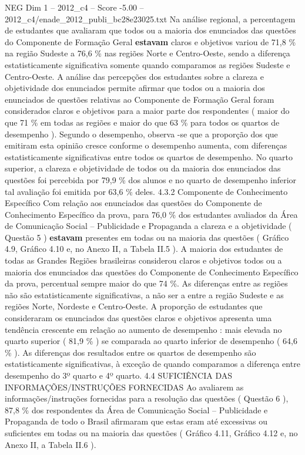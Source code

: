 \begin{textsample}{NEG Dim 1 – 2012\_c4 – Score -5.00 – 2012\_c4/enade\_2012\_publi\_bc28e23025.txt}
Na análise regional, a percentagem de estudantes que avaliaram que todos ou a maioria dos enunciados das questões do Componente de Formação Geral \textbf{estavam} claros e objetivos variou de 71,8 \% na região Sudeste a 76,6 \% nas regiões Norte e Centro-Oeste, sendo a diferença estatisticamente significativa somente quando comparamos as regiões Sudeste e Centro-Oeste.
A análise das percepções dos estudantes sobre a clareza e objetividade dos enunciados permite afirmar que todos ou a maioria dos enunciados de questões relativas ao Componente de Formação Geral foram considerados claros e objetivos para a maior parte dos respondentes ( maior do que 71 \% em todas as regiões e maior do que 63 \% para todos os quartos de desempenho ).
Segundo o desempenho, observa -se que a proporção dos que emitiram esta opinião cresce conforme o desempenho aumenta, com diferenças estatisticamente significativas entre todos os quartos de desempenho.
No quarto superior, a clareza e objetividade de todos ou da maioria dos enunciados das questões foi percebida por 79,9 \% dos alunos e no quarto de desempenho inferior tal avaliação foi emitida por 63,6 \% deles. 4.3.2 Componente de Conhecimento Específico Com relação aos enunciados das questões do Componente de Conhecimento Específico da prova, para 76,0 \% dos estudantes avaliados da Área de Comunicação Social – Publicidade e Propaganda a clareza e a objetividade ( Questão 5 ) \textbf{estavam} presentes em todas ou na maioria das questões ( Gráfico 4.9, Gráfico 4.10 e, no Anexo II, a Tabela II.5 ).
A maioria dos estudantes de todas as Grandes Regiões brasileiras considerou claros e objetivos todos ou a maioria dos enunciados das questões do Componente de Conhecimento Específico da prova, percentual sempre maior do que 74 \%.
As diferenças entre as regiões não são estatisticamente significativas, a não ser a entre a região Sudeste e as regiões Norte, Nordeste e Centro-Oeste.
A proporção de estudantes que consideraram os enunciados das questões claros e objetivos apresenta uma tendência crescente em relação ao aumento de desempenho : mais elevada no quarto superior ( 81,9 \% ) se comparada ao quarto inferior de desempenho ( 64,6 \% ).
As diferenças dos resultados entre os quartos de desempenho são estatisticamente significativas, à exceção de quando comparamos a diferença entre desempenho do 3º quarto e 4º quarto. 4.4 SUFICIÊNCIA DAS INFORMAÇÕES/INSTRUÇÕES FORNECIDAS Ao avaliarem as informações/instruções fornecidas para a resolução das questões ( Questão 6 ), 87,8 \% dos respondentes da Área de Comunicação Social – Publicidade e Propaganda de todo o Brasil afirmaram que estas eram até excessivas ou suficientes em todas ou na maioria das questões ( Gráfico 4.11, Gráfico 4.12 e, no Anexo II, a Tabela II.6 ).

\end{textsample}
